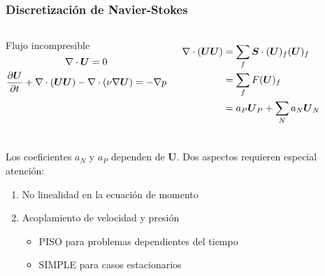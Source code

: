 \begin{frame}
    \frametitle{Discretizaci\'on de Navier-Stokes}
    

    \begin{columns}
        
        \begin{block}{\centering Flujo incompresible}
            $$ \nabla \cdot \boldsymbol{U} = 0 $$
            $$ \frac{\partial \boldsymbol{U}}{\partial t} + \nabla \cdot (\boldsymbol{U}\boldsymbol{U}) - \nabla \cdot (\nu \nabla \boldsymbol{U}) = -\nabla p$$
        \end{block}
        
        
        \begin{align*}
            \nabla \cdot (\boldsymbol{U}\boldsymbol{U}) &= \sum_f \boldsymbol{S} \cdot (\boldsymbol{U})_f (\boldsymbol{U})_f \\
                                                &= \sum_f F (\boldsymbol{U})_f \\
                                                &= a_P\boldsymbol{U}_P + \sum_N a_N\boldsymbol{U}_N 
        \end{align*}     
        
    \end{columns}

    \vspace{0.5cm}
    Los coeficientes $a_N$ y $a_P$ dependen de {\bf U}.
    Dos aspectos requieren especial atenci\'on:
    \begin{enumerate}
        \item No linealidad en la ecuaci\'on de momento
        \item Acoplamiento de velocidad y presi\'on
        \begin{itemize}
            \item PISO para problemas dependientes del tiempo
            \item SIMPLE para casos estacionarios
        \end{itemize}
    \end{enumerate}

\end{frame} 




